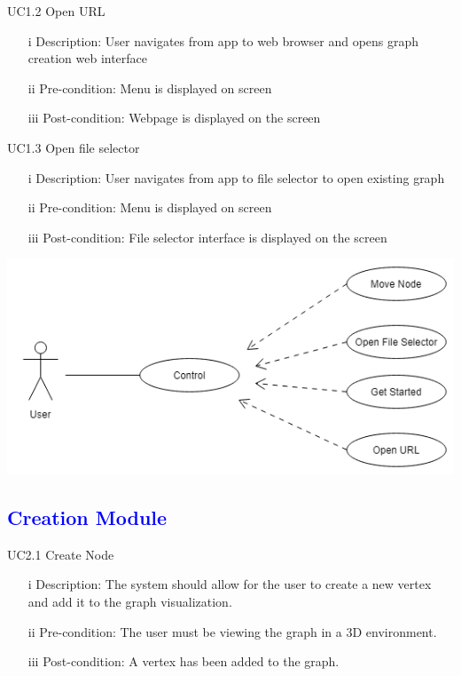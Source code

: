 \documentclass[12pt]{article}
\begin{document}
\begin{flushleft}
UC1.2 Open URL
\begin{itemize}
\item[i] Description: User navigates from app to web browser and opens graph creation web interface
\item[ii] Pre-condition: Menu is displayed on screen
\item[iii] Post-condition: Webpage is displayed on the screen
\end{itemize}
\end{flushleft}

\bigskip

\begin{flushleft}
UC1.3 Open file selector
\begin{itemize}
\item[i] Description: User navigates from app to file selector to open existing graph
\item[ii] Pre-condition: Menu is displayed on screen
\item[iii] Post-condition: File selector interface is displayed on the screen
\end{itemize}
\end{flushleft}

\includegraphics[scale=0.5]{Dps/Control.png}

\bigskip

\textcolor{blue}{\subsection{Creation Module}}
\begin{flushleft}
UC2.1 Create Node
\begin{itemize}
\item[i] Description: The system should allow for the user to create a new vertex and add it to the graph visualization.
\item[ii] Pre-condition: The user must be viewing the graph in a 3D environment.
\item[iii] Post-condition: A vertex has been added to the graph.
\end{itemize}
\end{flushleft}
\end{document}
